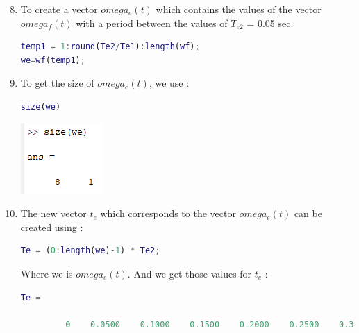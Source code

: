 \documentclass[a4paper,12pt]{article}
\begin{document}
\begin{enumerate}[label={\color{blue}\arabic*)}]
    \setcounter{enumi}{7}

    \item
    To create a vector \(omega_e(t)\) which contains the values of the vector \(omega_f(t)\) with a period between the values of \(T_{e2}\) = 0.05 sec.
    \begin{lstlisting}[style=Matlab-editor,language=Matlab, basicstyle=\small\ttfamily]
temp1 = 1:round(Te2/Te1):length(wf);
we=wf(temp1);
        \end{lstlisting}

    \item
    To get the size of \(omega_e(t)\), we use :
    \begin{lstlisting}[style=Matlab-editor,language=Matlab, basicstyle=\small\ttfamily]
size(we)
        \end{lstlisting}
    \begin{flushleft}
            \includegraphics[width=0.25\linewidth]{Images/size_we.png}
            \label{Figure6}
        \end{flushleft}

    \item
    The new vector \(t_e\) which corresponds to the vector \(omega_e(t)\) can be created using :
    \begin{lstlisting}[style=Matlab-editor,language=Matlab, basicstyle=\small\ttfamily]
Te = (0:length(we)-1) * Te2;
        \end{lstlisting}
    Where we is \(omega_e(t)\).
    \newline
    \newline
    And we get those values for \(t_e\) :
    \begin{lstlisting}[style=Matlab-editor,language=Matlab, basicstyle=\small\ttfamily]
Te =

         0    0.0500    0.1000    0.1500    0.2000    0.2500    0.3000    0.3500
        \end{lstlisting}


\end{enumerate}
\end{document}
